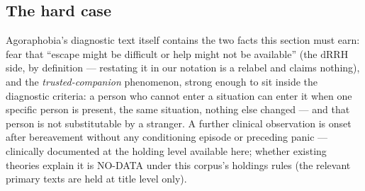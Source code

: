 \documentclass[9pt,twocolumn]{article}
\newcommand{\dRRH}{\mathrm{dRRH}}
\begin{document}
\subsection{The hard case}
Agoraphobia's diagnostic text itself contains the two facts this section must earn: fear that ``escape might be difficult or help might not be available'' (the $\dRRH$ side, by definition --- restating it in our notation is a relabel and claims nothing), and the \emph{trusted-companion} phenomenon, strong enough to sit inside the diagnostic criteria: a person who cannot enter a situation can enter it when one specific person is present, the same situation, nothing else changed --- and that person is not substitutable by a stranger. A further clinical observation is onset after bereavement without any conditioning episode or preceding panic --- clinically documented at the holding level available here; whether existing theories explain it is NO-DATA under this corpus's holdings rules (the relevant primary texts are held at title level only).
\end{document}
